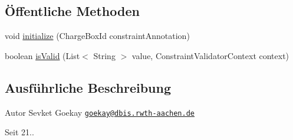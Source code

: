 \subsection*{Öffentliche Methoden}
\begin{DoxyCompactItemize}
\item 
void \hyperlink{classde_1_1rwth_1_1idsg_1_1steve_1_1web_1_1validation_1_1_charge_box_id_list_validator_aaa688499b319d02e6da411d0576e6c4c}{initialize} (Charge\+Box\+Id constraint\+Annotation)
\item 
boolean \hyperlink{classde_1_1rwth_1_1idsg_1_1steve_1_1web_1_1validation_1_1_charge_box_id_list_validator_a121f0004fceaeb1a11e2a5033c48778e}{is\+Valid} (List$<$ String $>$ value, Constraint\+Validator\+Context context)
\end{DoxyCompactItemize}


\subsection{Ausführliche Beschreibung}
\begin{DoxyAuthor}{Autor}
Sevket Goekay \href{mailto:goekay@dbis.rwth-aachen.de}{\tt goekay@dbis.\+rwth-\/aachen.\+de} 
\end{DoxyAuthor}
\begin{DoxySince}{Seit}
21.. 
\end{DoxySince}


